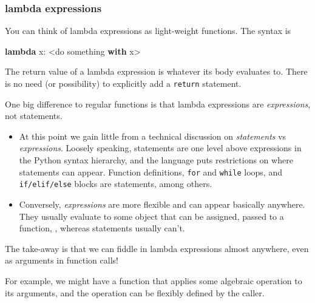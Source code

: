 \documentclass{scrartcl}
\providecommand{\tightlist}{%
      \setlength{\itemsep}{0pt}\setlength{\parskip}{0pt}}
\newenvironment{Shaded}{}{}
\newcommand{\KeywordTok}[1]{\textcolor[rgb]{0.00,0.44,0.13}{\textbf{{#1}}}}
\newcommand{\NormalTok}[1]{{#1}}
\newcommand{\ControlFlowTok}[1]{\textcolor[rgb]{0.00,0.44,0.13}{\textbf{{#1}}}}
\newcommand{\OperatorTok}[1]{\textcolor[rgb]{0.40,0.40,0.40}{{#1}}}
\begin{document}
    \hypertarget{lambda-expressions}{%
\subsubsection{lambda expressions}\label{lambda-expressions}}

You can think of lambda expressions as light-weight functions. The
syntax is

\begin{Shaded}
\begin{Highlighting}[]
\KeywordTok{lambda}\NormalTok{ x: }\OperatorTok{\textless{}}\NormalTok{do something }\ControlFlowTok{with}\NormalTok{ x}\OperatorTok{\textgreater{}}
\end{Highlighting}
\end{Shaded}

The return value of a lambda expression is whatever its body evaluates
to. There is no need (or possibility) to explicitly add a
\texttt{return} statement.

One big difference to regular functions is that lambda expressions are
\emph{expressions}, not statements.

\begin{itemize}
\tightlist
\item
  At this point we gain little from a technical discussion on
  \emph{statements} vs \emph{expressions}. Loosely speaking, statements
  are one level above expressions in the Python syntax hierarchy, and
  the language puts restrictions on where statements can appear.
  Function definitions, \texttt{for} and \texttt{while} loops, and
  \texttt{if/elif/else} blocks are statements, among others.
\item
  Conversely, \emph{expressions} are more flexible and can appear
  basically anywhere. They usually evaluate to some object that can be
  assigned, passed to a function, \etc, whereas statements usually
  can't.
\end{itemize}

The take-away is that we can fiddle in lambda expressions almost
anywhere, even as arguments in function calls!

For example, we might have a function that applies some algebraic
operation to its arguments, and the operation can be flexibly defined by
the caller.
\end{document}
